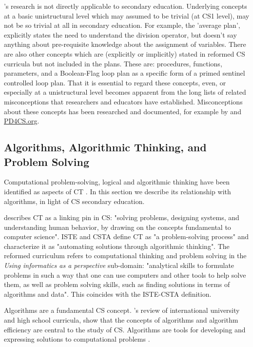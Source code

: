 \citeauthor{deRaadt2009teachingPlans}'s research is not directly applicable to secondary education. Underlying concepts at a basic unistructural level which may assumed to be trivial (at CS1 level), may not be so trivial at all in secondary education. For example, the 'average plan', explicitly states the need to understand the division operator, but doesn't say anything about pre-requisite knowledge about the assignment of variables. There are also other concepts which are (explicitly or implicitly) stated in reformed CS curricula but not included in the plans. These are: procedures, functions, parameters, and a Boolean-Flag loop plan as a specific form of a primed sentinel controlled loop plan. That it is essential to regard these concepts, even, or especially at a unistructural level becomes apparent from the long lists of related misconceptions that researchers and educators have established. Misconceptions about these concepts has been researched and documented, for example by \citeauthor{sorva2012misconceptions} and \url{PD4CS.org}.



\subsection{Algorithms, Algorithmic Thinking, and Problem Solving}\label{sec:AlgProblemSolving}
Computational problem-solving, logical and algorithmic thinking have been identified as aspects of CT \cite{grover2017measuring}. In this section we describe its relationship with algorithms, in light of CS secondary education.


 describes CT as a linking pin in CS: "solving problems, designing systems, and understanding human behavior, by drawing on the concepts fundamental to computer science". ISTE and CSTA define CT as "a problem-solving process"\cite{CSTA2011CT} and characterize it as "automating solutions through algorithmic thinking". The reformed curriculum refers to computational thinking and problem solving in the \emph{Using informatics as a perspective} sub-domain: "analytical skills to formulate problems in such a way that one can use computers and other tools to help solve them, as well as problem solving skills,
such as finding solutions in terms of algorithms and data"\cite{Barendsen2016}. This coincides with the ISTE-CSTA definition.




Algorithms are a fundamental CS concept. 's review of international university and high school curricula, show that the concepts of algorithms and algorithm efficiency are central to the study of CS. Algorithms are tools for developing and expressing solutions to computational problems \cite{GroverPea2013}.


